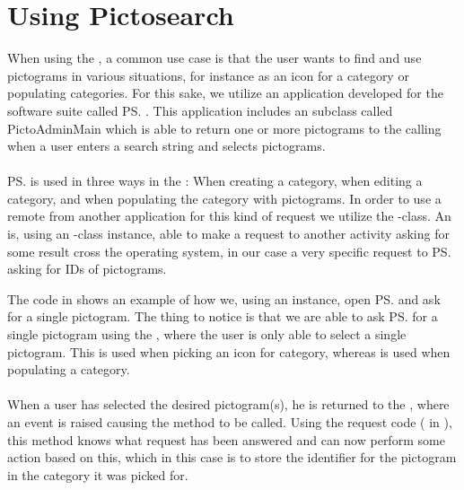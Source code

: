 
\section{Using Pictosearch}
\label{sec:using_pictosearch}

When using the \ct, a common use case is that the user wants to find and use pictograms in various situations, for instance as an icon for a category or populating categories. For this sake, we utilize an application developed for the \giraf software suite called \ps. This application includes an  subclass called PictoAdminMain  which is able to return one or more pictograms to the calling  when a user enters a search string and selects pictograms. 
\\\\
\ps is used in three ways in the \ct: When creating a category, when editing a category, and when populating the category with pictograms. In order to use a remote  from another application for this kind of request we utilize the -class. An  is, using an -class instance, able to make a request to another activity asking for some result cross the operating system, in our case a very specific request to \ps asking for IDs of pictograms. 



The code in  shows an example of how we, using an  instance, open \ps and ask for a single pictogram. The thing to notice is that we are able to ask \ps for a single pictogram using the , where the user is only able to select a single pictogram. This is used when picking an icon for category, whereas  is used when populating a category. 
\\\\
When a user has selected the desired pictogram(s), he is returned to the \ct, where an event is raised causing the method  to be called. Using the request code ( in ), this method knows what request has been answered and can now perform some action based on this, which in this case is to store the identifier for the pictogram in the category it was picked for.

